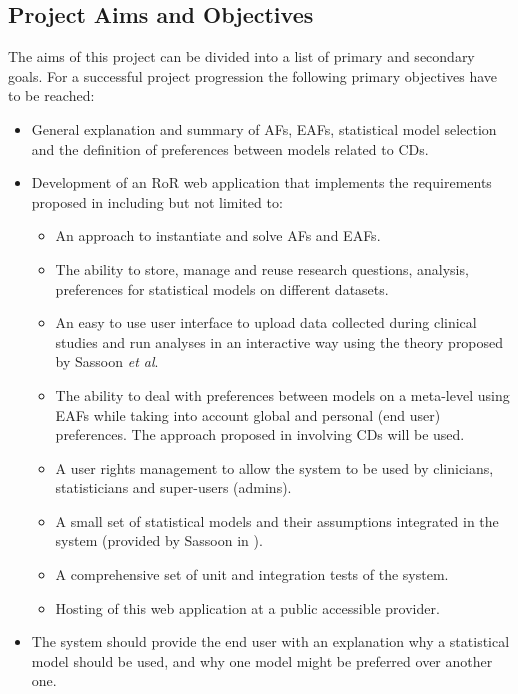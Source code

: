 
\subsection{Project Aims and Objectives} 
\label{sub:aims}

The aims of this project can be divided into a list of primary and secondary goals. For a successful project progression the following primary objectives have to be reached:
\begin{itemize}
	\item General explanation and summary of \glspl{AF}, \glspl{EAF}, statistical model selection and the definition of preferences between models related to \glspl{CD}.
	\item Development of an \gls{RoR} web application that implements the requirements proposed in \cite{sassoon2014,sassoon2016CD} including but not limited to:
	\begin{itemize}
		\item An approach to instantiate and solve \glspl{AF} and \glspl{EAF}.
		\item The ability to store, manage and reuse research questions, analysis, preferences for statistical models on different datasets.
		\item An easy to use user interface to upload data collected during clinical studies and run analyses in an interactive way using the theory proposed by Sassoon \textit{et al}.
		\item The ability to deal with preferences between models on a meta-level using \glspl{EAF} while taking into account global and personal (end user) preferences. The approach proposed in \cite{sassoon2016CD} involving \glspl{CD} will be used.
		\item A user rights management to allow the system to be used by clinicians, statisticians and super-users (admins).
		\item A small set of statistical models and their assumptions integrated in the system (provided by Sassoon in \cite{sassoon2016CD}).
		\item A comprehensive set of unit and integration tests of the system.
		\item Hosting of this web application at a public accessible provider.
	\end{itemize}	
	\item The system should provide the end user with an explanation why a statistical model should be used, and why one model might be preferred over another one.
\end{itemize}

